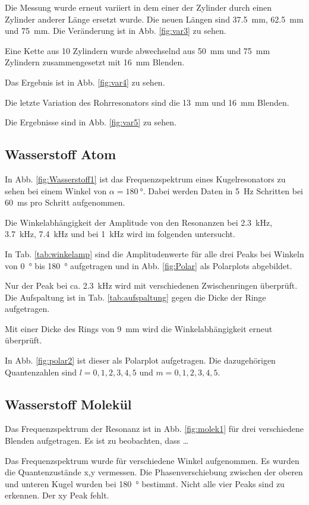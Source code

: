 Die Messung wurde erneut variiert in dem einer der Zylinder durch einen Zylinder anderer Länge ersetzt wurde. Die neuen Längen sind \SI{37.5}{\milli\meter}, \SI{62.5}{\milli\meter} und \SI{75}{\milli\meter}.
Die Veränderung ist in Abb. \ref{fig:var3} zu sehen.

Eine Kette aus 10 Zylindern wurde abwechselnd aus \SI{50}{\milli\meter} und \SI{75}{\milli\meter} Zylindern zusammengesetzt mit \SI{16}{\milli\meter} Blenden.

Das Ergebnis ist in Abb. \ref{fig:var4} zu sehen. 

Die letzte Variation des Rohrresonators sind die \SI{13}{\milli\meter} und \SI{16}{\milli\meter} Blenden. 

Die Ergebnisse sind in Abb. \ref{fig:var5} zu sehen.

\subsection{Wasserstoff Atom}

In Abb. \ref{fig:Wasserstoff1} ist das Frequenzspektrum eines Kugelresonators zu sehen bei einem Winkel von $\alpha = \SI{180}{\degree}$. 
Dabei werden Daten in \SI{5}{\hertz} Schritten bei \SI{60}{\milli\second} pro Schritt aufgenommen.

Die Winkelabhängigkeit der Amplitude von den Resonanzen bei \SI{2.3}{\kilo\hertz}, \SI{3.7}{\kilo\hertz}, \SI{7.4}{\kilo\hertz} und bei \SI{1}{\kilo\hertz} wird im folgenden untersucht. 

In Tab. \ref{tab:winkelamp} sind die Amplitudenwerte für alle drei Peaks bei Winkeln von \SI{0}{\degree} bis \SI{180}{\degree} aufgetragen und in Abb. \ref{fig:Polar} als Polarplots abgebildet.

Nur der Peak bei ca. \SI{2.3}{\kilo\hertz} wird mit verschiedenen Zwischenringen überprüft. Die Aufspaltung ist in Tab. \ref{tab:aufspaltung} gegen die Dicke der Ringe aufgetragen.

Mit einer Dicke des Rings von \SI{9}{\milli\meter} wird die Winkelabhängigkeit erneut überprüft.

In Abb. \ref{fig:polar2} ist dieser als Polarplot aufgetragen. Die dazugehörigen Quantenzahlen sind $l = 0, 1,2,3,4,5$ und $ m = 0, 1, 2,3,4,5$. 

\subsection{Wasserstoff Molekül}

Das Frequenzspektrum der Resonanz ist in Abb. \ref{fig:molek1} für drei verschiedene Blenden aufgetragen. 
Es ist zu beobachten, dass \dots

Das Frequenzspektrum wurde für verschiedene Winkel aufgenommen. Es wurden die Quantenzustände x,y vermessen. 
Die Phasenverschiebung zwischen der oberen und unteren Kugel wurden bei \SI{180}{\degree} bestimmt. 
Nicht alle vier Peaks sind zu erkennen. Der xy Peak fehlt. 